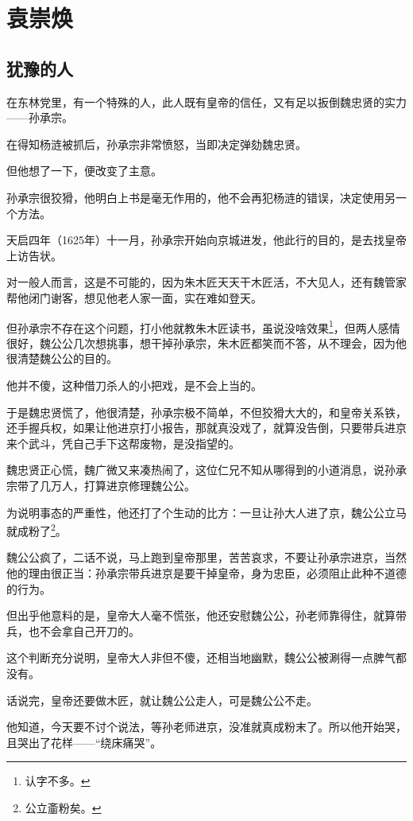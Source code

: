 \section{袁崇焕}
\ifnum{}
	\begin{multicols}{\theparacolNo}
\fi
\subsection{犹豫的人}
在东林党里，有一个特殊的人，此人既有皇帝的信任，又有足以扳倒魏忠贤的实力——孙承宗。

在得知杨涟被抓后，孙承宗非常愤怒，当即决定弹劾魏忠贤。

但他想了一下，便改变了主意。

孙承宗很狡猾，他明白上书是毫无作用的，他不会再犯杨涟的错误，决定使用另一个方法。

天启四年（1625年）十一月，孙承宗开始向京城进发，他此行的目的，是去找皇帝上访告状。

对一般人而言，这是不可能的，因为朱木匠天天干木匠活，不大见人，还有魏管家帮他闭门谢客，想见他老人家一面，实在难如登天。

但孙承宗不存在这个问题，打小他就教朱木匠读书，虽说没啥效果\footnote{认字不多。}，但两人感情很好，魏公公几次想挑事，想干掉孙承宗，朱木匠都笑而不答，从不理会，因为他很清楚魏公公的目的。

他并不傻，这种借刀杀人的小把戏，是不会上当的。

于是魏忠贤慌了，他很清楚，孙承宗极不简单，不但狡猾大大的，和皇帝关系铁，还手握兵权，如果让他进京打小报告，那就真没戏了，就算没告倒，只要带兵进京来个武斗，凭自己手下这帮废物，是没指望的。

魏忠贤正心慌，魏广微又来凑热闹了，这位仁兄不知从哪得到的小道消息，说孙承宗带了几万人，打算进京修理魏公公。

为说明事态的严重性，他还打了个生动的比方：一旦让孙大人进了京，魏公公立马就成粉了\footnote{公立齑粉矣。}。

魏公公疯了，二话不说，马上跑到皇帝那里，苦苦哀求，不要让孙承宗进京，当然他的理由很正当：孙承宗带兵进京是要干掉皇帝，身为忠臣，必须阻止此种不道德的行为。

但出乎他意料的是，皇帝大人毫不慌张，他还安慰魏公公，孙老师靠得住，就算带兵，也不会拿自己开刀的。

这个判断充分说明，皇帝大人非但不傻，还相当地幽默，魏公公被涮得一点脾气都没有。

话说完，皇帝还要做木匠，就让魏公公走人，可是魏公公不走。

他知道，今天要不讨个说法，等孙老师进京，没准就真成粉末了。所以他开始哭，且哭出了花样——“绕床痛哭”。


\end{multicols}
